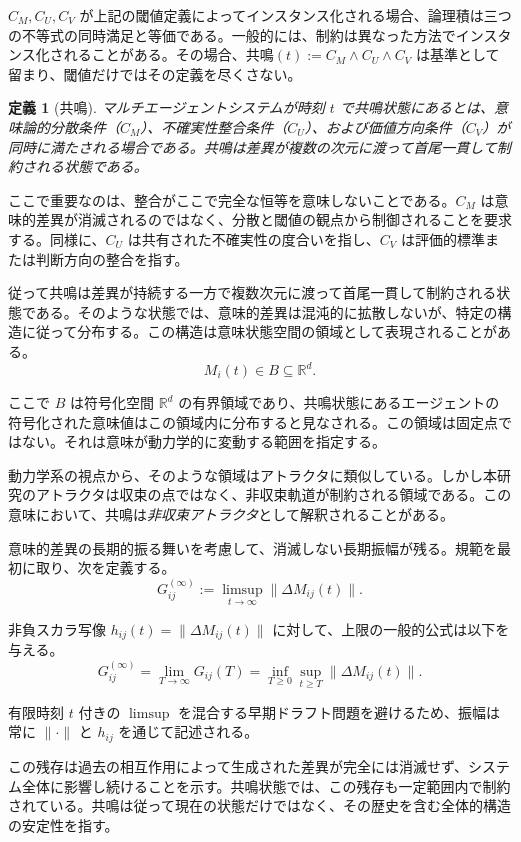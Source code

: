 \documentclass[11pt,a4paper]{article}
\theoremstyle{definition}
\newtheorem{definition}{定義}[section]
\begin{document}
$C_M, C_U, C_V$ が上記の閾値定義によってインスタンス化される場合、論理積は三つの不等式の同時満足と等価である。一般的には、制約は異なった方法でインスタンス化されることがある。その場合、$\text{共鳴}(t) := C_M \land C_U \land C_V$ は基準として留まり、閾値だけではその定義を尽くさない。

\begin{definition}[共鳴]
\textit{マルチエージェントシステムが時刻 $t$ で共鳴状態にあるとは、意味論的分散条件（$C_M$）、不確実性整合条件（$C_U$）、および価値方向条件（$C_V$）が同時に満たされる場合である。共鳴は差異が複数の次元に渡って首尾一貫して制約される状態である。}
\end{definition}

ここで重要なのは、整合がここで完全な恒等を意味しないことである。$C_M$ は意味的差異が消滅されるのではなく、分散と閾値の観点から制御されることを要求する。同様に、$C_U$ は共有された不確実性の度合いを指し、$C_V$ は評価的標準または判断方向の整合を指す。

従って共鳴は差異が持続する一方で複数次元に渡って首尾一貫して制約される状態である。そのような状態では、意味的差異は混沌的に拡散しないが、特定の構造に従って分布する。この構造は意味状態空間の領域として表現されることがある。
\[
M_i(t) \in B \subseteq \mathbb{R}^d.
\]

ここで $B$ は符号化空間 $\mathbb{R}^d$ の有界領域であり、共鳴状態にあるエージェントの符号化された意味値はこの領域内に分布すると見なされる。この領域は固定点ではない。それは意味が動力学的に変動する範囲を指定する。

動力学系の視点から、そのような領域はアトラクタに類似している。しかし本研究のアトラクタは収束の点ではなく、非収束軌道が制約される領域である。この意味において、共鳴は\textit{非収束アトラクタ}として解釈されることがある。

意味的差異の長期的振る舞いを考慮して、消滅しない長期振幅が残る。規範を最初に取り、次を定義する。
\[
G^{(\infty)}_{ij} := \limsup_{t \to \infty} \|\Delta M_{ij}(t)\|.
\]

非負スカラ写像 $h_{ij}(t) = \|\Delta M_{ij}(t)\|$ に対して、上限の一般的公式は以下を与える。
\[
G^{(\infty)}_{ij} = \lim_{T \to \infty} G_{ij}(T) = \inf_{T \geq 0} \sup_{t \geq T} \|\Delta M_{ij}(t)\|.
\]

有限時刻 $t$ 付きの $\limsup$ を混合する早期ドラフト問題を避けるため、振幅は常に $\|\cdot\|$ と $h_{ij}$ を通じて記述される。

この残存は過去の相互作用によって生成された差異が完全には消滅せず、システム全体に影響し続けることを示す。共鳴状態では、この残存も一定範囲内で制約されている。共鳴は従って現在の状態だけではなく、その歴史を含む全体的構造の安定性を指す。
\end{document}
